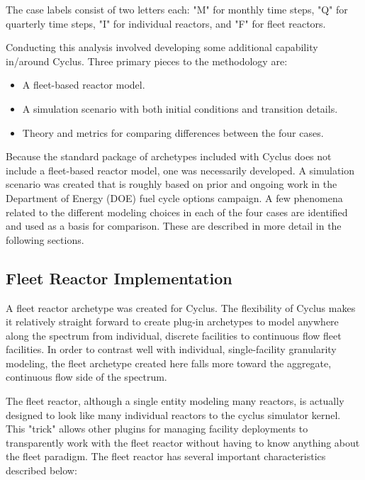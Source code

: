 \documentclass{style}
\begin{document}
The case labels consist of two letters each: "M" for monthly time steps, "Q"
for quarterly time steps, "I" for individual reactors, and "F" for fleet
reactors.

Conducting this analysis involved developing some additional capability
in/around Cyclus.  Three primary pieces to the methodology are:

\begin{itemize}

    \item A fleet-based reactor model.

    \item A simulation scenario with both initial conditions and transition
        details.

    \item Theory and metrics for comparing differences between the four cases.

\end{itemize}

Because the standard package of archetypes included with Cyclus does not
include a fleet-based reactor model, one was necessarily developed. A
simulation scenario was created that is roughly based on prior and ongoing
work in the Department of Energy (DOE) fuel cycle options campaign.  A few
phenomena related to the different modeling choices in each of the four cases
are identified and used as a basis for comparison.  These are
described in more detail in the following sections.

\subsection{Fleet Reactor Implementation}

A fleet reactor archetype was created for Cyclus.  The flexibility of Cyclus
makes it relatively straight forward to create plug-in archetypes to model
anywhere along the spectrum from individual, discrete facilities to
continuous flow fleet facilities.  In order to contrast well with individual,
single-facility granularity modeling, the fleet archetype created here falls more
toward the aggregate, continuous flow side of the spectrum.  

The fleet reactor, although a single entity modeling many reactors, is
actually designed to look like many individual reactors to the cyclus
simulator kernel. This "trick" allows other plugins for managing facility
deployments to transparently work with the fleet reactor without having to
know anything about the fleet paradigm.  The fleet reactor has several
important characteristics described below:
\end{document}
